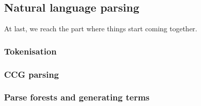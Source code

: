 \documentclass[main.tex]{subfiles}
\begin{document}
\subsection{Natural language parsing}
At last, we reach the part where things start coming together.
\subsubsection{Tokenisation}\label{sec:tokenisation}
\subsubsection{CCG parsing}
\subsubsection{Parse forests and generating terms}\label{sec:termgen}
\end{document}
